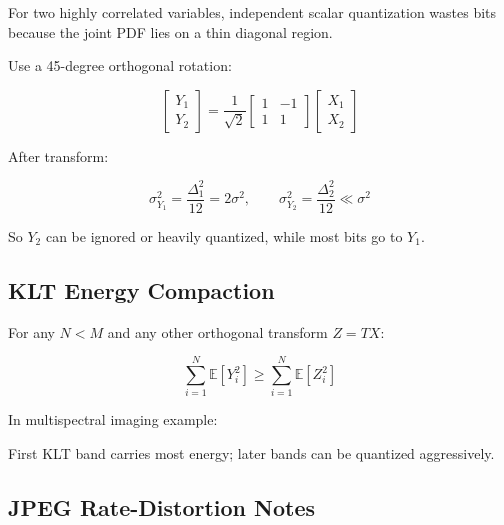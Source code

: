 For two highly correlated variables, independent scalar quantization wastes bits because the joint PDF lies on a thin diagonal region.

Use a 45-degree orthogonal rotation:

\[
\begin{bmatrix}
Y_1\\Y_2
\end{bmatrix}
=
\frac{1}{\sqrt{2}}
\begin{bmatrix}
1&-1\\
1&1
\end{bmatrix}
\begin{bmatrix}
X_1\\X_2
\end{bmatrix}
\]

After transform:

\[
\sigma_{Y_1}^2=\frac{\Delta_1^2}{12}=2\sigma^2,
\qquad
\sigma_{Y_2}^2=\frac{\Delta_2^2}{12}\ll\sigma^2
\]

So $Y_2$ can be ignored or heavily quantized, while most bits go to $Y_1$.

\subsection{KLT Energy Compaction}

For any $N<M$ and any other orthogonal transform $Z=TX$:

\[
\sum_{i=1}^{N}\mathbb{E}[Y_i^2]
\geq
\sum_{i=1}^{N}\mathbb{E}[Z_i^2]
\]

In multispectral imaging example:

\begin{center}
\end{center}

First KLT band carries most energy; later bands can be quantized aggressively.

\subsection{JPEG Rate-Distortion Notes}

